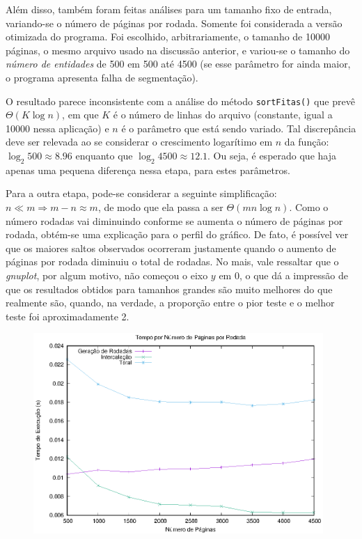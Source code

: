 \documentclass{article}
\def\code#1{\texttt{#1}}
\begin{document}
Além disso, também foram feitas análises para um tamanho fixo de entrada, variando-se o número de páginas por rodada. Somente foi considerada a versão otimizada do programa. Foi escolhido, arbitrariamente, o tamanho de 10000 páginas, o mesmo arquivo usado na discussão anterior, e variou-se o tamanho do \textit{número de entidades} de 500 em 500 até 4500 (se esse parâmetro for ainda maior, o programa apresenta falha de segmentação).

O resultado parece inconsistente com a análise do método \code{sortFitas()} que prevê \( \Theta(K \log n) \), em que \( K \) é o número de linhas do arquivo (constante, igual a 10000 nessa aplicação) e \( n \) é o parâmetro que está sendo variado. Tal discrepância deve ser relevada ao se considerar o crescimento logarítimo em \( n \) da função: \( \log_2 500 \approx 8.96 \) enquanto que \( \log_2 4500 \approx 12.1 \). Ou seja, é esperado que haja apenas uma pequena diferença nessa etapa, para estes parâmetros.

Para a outra etapa, pode-se considerar a seguinte simplificação: \( n \ll m \Rightarrow m - n \approx m \), de modo que ela passa a ser \( \Theta(mn \log n) \). Como o número rodadas vai diminuindo conforme se aumenta o número de páginas por rodada, obtém-se uma explicação para o perfil do gráfico. De fato, é possível ver que os maiores saltos observados ocorreram justamente quando o aumento de páginas por rodada diminuiu o total de rodadas. No mais, vale ressaltar que o \textit{gnuplot}, por algum motivo, não começou o eixo \( y \) em 0, o que dá a impressão de que os resultados obtidos para tamanhos grandes são muito melhores do que realmente são, quando, na verdade, a proporção entre o pior teste e o melhor teste foi aproximadamente 2.

\begin{figure}[H]
	\includegraphics[width=11cm]{rounds.eps}
	\centering
\end{figure}
\end{document}
